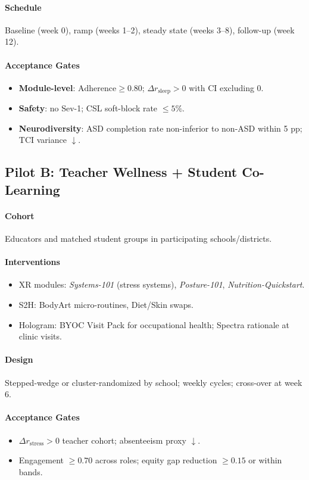 \documentclass[11pt]{article}
\theoremstyle{plain}
\begin{document}
\paragraph{Schedule}
Baseline (week 0), ramp (weeks 1--2), steady state (weeks 3--8), follow-up (week 12).
\paragraph{Acceptance Gates}
\begin{itemize}
  \item \textbf{Module-level}: \(\mathrm{Adherence}\ge 0.80\); \(\Delta r_{\mathrm{sleep}}>0\) with CI excluding 0.
  \item \textbf{Safety}: no Sev-1; CSL soft-block rate \(\le 5\%\).
  \item \textbf{Neurodiversity}: ASD completion rate non-inferior to non-ASD within 5 pp; TCI variance \(\downarrow\).
\end{itemize}

\subsection*{Pilot B: Teacher Wellness + Student Co-Learning}
\paragraph{Cohort}
Educators and matched student groups in participating schools/districts.
\paragraph{Interventions}
\begin{itemize}
  \item XR modules: \emph{Systems-101} (stress systems), \emph{Posture-101}, \emph{Nutrition-Quickstart}.
  \item S2H: BodyArt micro-routines, Diet/Skin swaps.
  \item Hologram: BYOC Visit Pack for occupational health; Spectra rationale at clinic visits.
\end{itemize}
\paragraph{Design}
Stepped-wedge or cluster-randomized by school; weekly cycles; cross-over at week 6.
\paragraph{Acceptance Gates}
\begin{itemize}
  \item \(\Delta r_{\mathrm{stress}}>0\) teacher cohort; absenteeism proxy \(\downarrow\).
  \item Engagement \(\ge 0.70\) across roles; equity gap reduction \(\ge 0.15\) or within bands.
\end{itemize}
\end{document}
